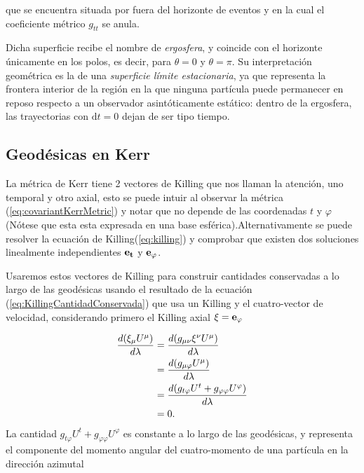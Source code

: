que se encuentra situada por fuera del horizonte de eventos y en la cual el coeficiente métrico $g_{tt}$ se anula.

Dicha superficie recibe el nombre de \textit{ergosfera}, y coincide con el horizonte únicamente en los polos, es decir, para $\theta=0$ y $\theta=\pi$. Su interpretación geométrica es la de una \textit{superficie límite estacionaria}, ya que representa la frontera interior de la región en la que ninguna partícula puede permanecer en reposo respecto a un observador asintóticamente estático: dentro de la ergosfera, las trayectorias con $\mathrm{d}t=0$ dejan de ser tipo tiempo.



\subsection{Geodésicas en Kerr}



La métrica de Kerr tiene 2 vectores de Killing que nos llaman la atención, uno temporal y otro axial, esto se puede intuir al observar la métrica (\ref{eq:covariantKerrMetric}) y notar que no depende de las coordenadas $t$ y $\varphi$ (Nótese que esta esta expresada en una base esférica).Alternativamente se puede resolver la ecuación de Killing(\ref{eq:killing}) y comprobar que existen dos soluciones linealmente independientes $\mathbf{e_t}$ y $\mathbf{e_\varphi}$.

Usaremos estos vectores de Killing para construir cantidades conservadas a lo largo de las geodésicas usando el resultado de la ecuación (\ref{eq:KillingCantidadConservada}) que usa un Killing y el cuatro-vector de velocidad, considerando primero el Killing axial $\mathbf{\xi}=\mathbf{e_\varphi}$

\begin{align}
      \frac{d (\xi_\mu U^\mu)}{d \lambda} & = \frac{d (g_{\mu\nu} \xi^\nu U^\mu)}{d \lambda}\\
      & =\frac{d (g_{\mu\varphi}  U^\mu)}{d \lambda}                           \\
      & =\frac{d (g_{ t \varphi}  U^t + g_{\varphi\varphi}  U^\varphi)}{d \lambda}                           \\
      & =0 .
\end{align}
La cantidad $g_{ t \varphi}  U^t + g_{\varphi\varphi}  U^\varphi$ es constante a lo largo de las geodésicas, y representa el componente del momento angular del cuatro-momento de una partícula en la dirección azimutal

